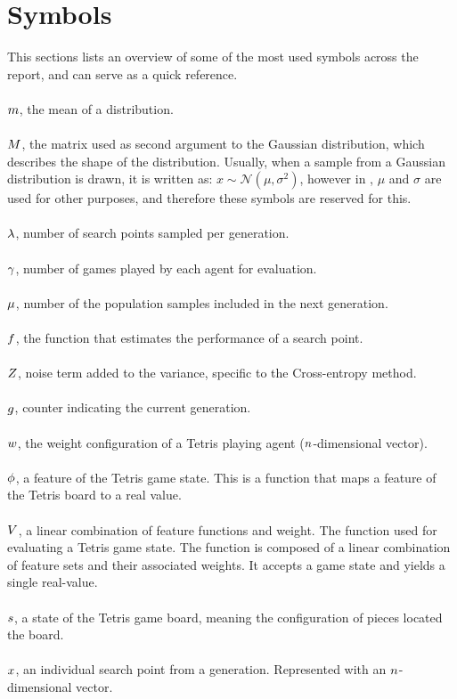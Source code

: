\clearpage
\thispagestyle{empty}
\section*{Symbols}

This sections lists an overview of some of the most 
used symbols across the report, and can serve as a quick
reference.\\
\\

$m$, the mean of a distribution.\\
\\
$M$, the matrix used as 
second argument to the Gaussian distribution, 
which describes the shape of the distribution. 
Usually, when a sample from a Gaussian distribution 
is drawn, it is written as: 
$x \sim \mathcal{N} \left( \mu, \sigma^{2} \right)$, 
however in \citep{hansen2011},
$\mu$ and $\sigma$ are used for other 
purposes, and therefore these symbols are reserved for this.\\
\\
$\lambda$, number of search points sampled per generation.\\
\\
$\gamma$, number of games played by each agent for evaluation.\\
\\
$\mu$, number of the population samples included in the next generation.\\
\\
$f$, the function that estimates the performance of a search point.\\
\\
$Z$, noise term added to the variance, specific to the Cross-entropy method.\\
\\
$g$, counter indicating the current generation.\\
\\
$w$, the weight configuration of a Tetris playing agent ($n $-dimensional vector).\\
\\
$\phi$, a feature of the Tetris game state. This is a function that maps a 
feature of the Tetris board to a real value.\\
\\
$V$, a linear combination of feature functions and weight. 
The function used for evaluating a Tetris game state. 
The function is composed of a linear combination of feature sets and their
associated weights. It accepts a game state and yields a single real-value.\\
\\
$s$, a state of the Tetris game board, meaning the
configuration of pieces located the board.\\
\\
$x$, an individual search point from a generation. 
Represented with an $n$-dimensional vector.

\clearpage

